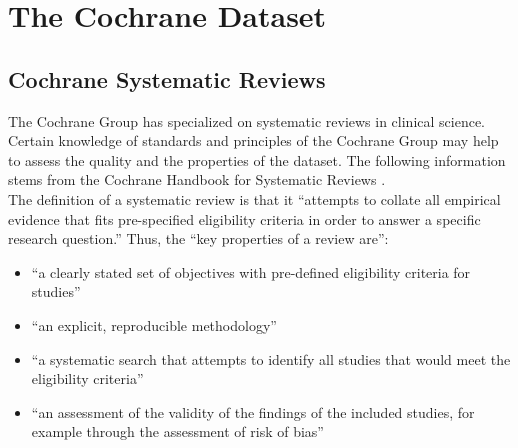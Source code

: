 \documentclass[11pt,a4paper,twoside]{book}\usepackage[]{graphicx}\usepackage[]{color}
\begin{document}












\chapter{The Cochrane Dataset} \label{ch:dataset}


\section{Cochrane Systematic Reviews}
The Cochrane Group has specialized on systematic reviews in clinical science. Certain knowledge of standards and principles of the Cochrane Group may help to assess the quality and the properties of the dataset. The following information stems from the Cochrane Handbook for Systematic Reviews \citep{cochrane.handbook}. \\
The definition of a systematic review is that it ``attempts to collate all empirical evidence that fits pre-specified eligibility criteria in order to answer a specific research question.'' Thus, the ``key properties of a review are'':

\begin{itemize}
\item``a clearly stated set of objectives with pre-defined eligibility criteria for studies''
\item ``an explicit, reproducible methodology''
\item ``a systematic search that attempts to identify all studies that would meet the eligibility criteria''
\item ``an assessment of the validity of the findings of the included studies, for example through the assessment of risk of bias''
\end{itemize}
\end{document}
